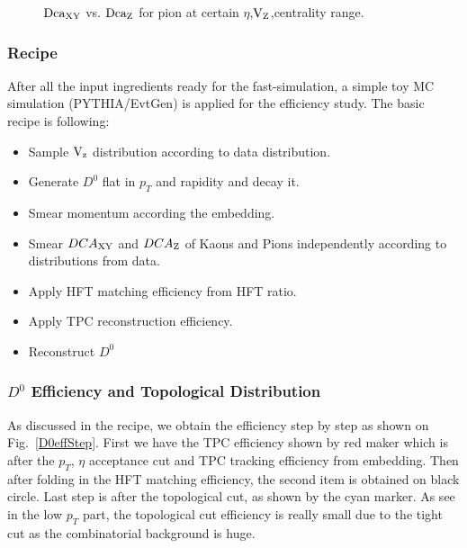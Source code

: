 \documentclass[a4paper]{article}
\begin{document}
\begin{figure}[htbp]
\begin{minipage}[htbp]{0.52\linewidth}
\caption{$\textup{Dca}_{\textup{XY}}$ vs. $\textup{Dca}_\textup{Z}$ for pion at certain $\eta$,$\textup{V}_{\textup{Z}}$,centrality range. \label{DcaExample}}
\end{minipage}
\end{figure}

\subsubsection{Recipe}
\label{recipe}
After all the input ingredients ready for the fast-simulation, a simple toy MC simulation (PYTHIA/EvtGen) is applied for the efficiency study. The basic recipe is following:
\begin{itemize}
\item Sample $\textup{V}_\textup{z}$ distribution according to data distribution.
\item Generate $D^0$ flat in $p_T$ and rapidity and decay it.
\item Smear momentum according the embedding.
\item Smear $DCA_{\textup{XY}}$ and $DCA_\textup{Z}$ of Kaons and Pions independently according to distributions from data.
\item Apply HFT matching efficiency from HFT ratio.
\item Apply TPC reconstruction efficiency.
\item Reconstruct $D^0$
\end{itemize}

\subsubsection{$D^0$ Efficiency and Topological Distribution}

As discussed in the recipe, we obtain the efficiency step by step as shown on Fig.~\ref{D0effStep}. First we have the TPC efficiency shown by red maker which is after the $p_T$, $\eta$ acceptance cut and TPC tracking efficiency from embedding. Then after folding in the HFT matching efficiency, the second item is obtained on black circle. Last step is after the topological cut, as shown by the cyan marker. As see in the low $p_T$ part, the topological cut efficiency is really small due to the tight cut as the combinatorial background is huge.
\end{document}

